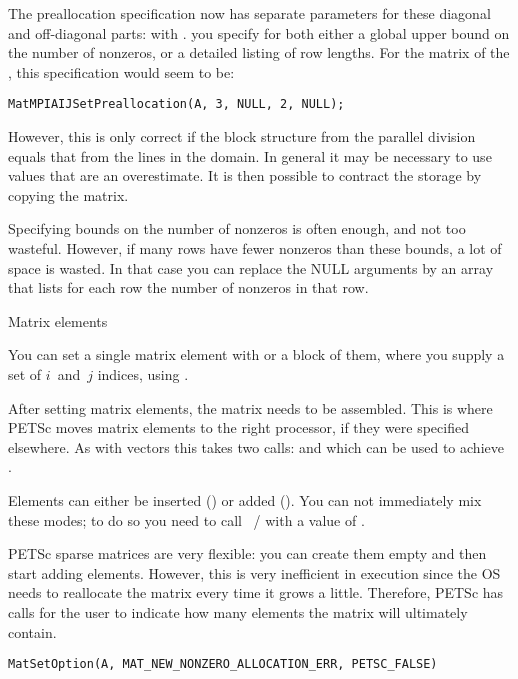 The preallocation specification now has separate parameters for
these diagonal and off-diagonal parts:
with 
.
you specify for both either a global upper bound on the number of nonzeros,
or a detailed listing of row lengths.
For the matrix of the , this specification
would seem to be:
\begin{lstlisting}
MatMPIAIJSetPreallocation(A, 3, NULL, 2, NULL);
\end{lstlisting}
However, this is only correct if the block structure from the parallel division
equals that from the lines in the domain.
In general it may be necessary to use values that are an overestimate.
It is then possible to contract the storage by copying the matrix.

Specifying bounds on the number of nonzeros is often enough, and not too wasteful. However,
if many rows have fewer nonzeros than these bounds, a lot of space is
wasted. In that case you can replace the NULL arguments by an array
that lists for each row the number of nonzeros in that row.

 {Matrix elements}

You can set a single matrix element with
%
%
or a block of them, where you
supply a set of $i$~and~$j$ indices, using
%
. 

After setting matrix elements, the matrix needs to be assembled. This
is where PETSc moves matrix elements to the right processor, if they
were specified elsewhere. As with vectors this takes two calls:
%
and
%
which can be used to achieve .

Elements can either be inserted
() or added
().
You can not immediately mix these modes; to do so you need to call
~/ 
with a value of .

PETSc sparse matrices are very flexible: you can create them empty and
then start adding elements. However, this is very inefficient in
execution since the \ac{OS} needs to reallocate the matrix every time
it grows a little. Therefore, PETSc has calls for the user to indicate
how many elements the matrix will ultimately contain.
%

\begin{lstlisting}
MatSetOption(A, MAT_NEW_NONZERO_ALLOCATION_ERR, PETSC_FALSE)
\end{lstlisting}

